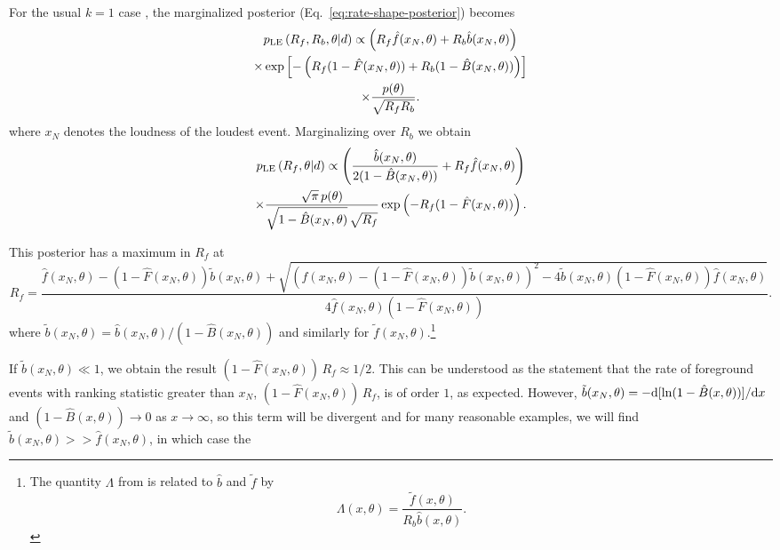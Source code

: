 \documentclass[aps,prd,reprint,nofootinbib]{revtex4-1}
\begin{document}
For the usual $k=1$ case \citep{Biswas2009}, the marginalized
posterior (Eq.~\eqref{eq:rate-shape-posterior}) becomes
\begin{multline}
p_{\rm LE}\left( R_f, R_b, \theta | d \right) \propto \left(R_f
\hat{f}(x_N,\theta) + R_b \hat{b}(x_N,\theta)\right) \\ \times \exp\left[-\left(
  R_f (1-\hat{F}(x_N,\theta)) + R_b (1-\hat{B}(x_N,\theta)) \right)
  \right] \\ \times \frac{p(\theta)}{\sqrt{R_f R_b}}.
\end{multline}
where $x_N$ denotes the loudness of the loudest event. Marginalizing
over $R_b$ we obtain
\begin{multline}
p_{\rm LE}\left( R_f, \theta | d \right) \propto \left(
\frac{\hat{b}(x_N,\theta)}{2(1-\hat{B}(x_N,\theta))} + R_f
\hat{f}(x_N,\theta)\right) \\ \times \frac{\sqrt{\pi}\,
  p(\theta)}{\sqrt{1-\hat{B}(x_N,\theta)}\,\sqrt{R_f}}
\exp\left(-R_f(1-\hat{F}(x_N,\theta))\right) .
\end{multline}
\begin{widetext}
This posterior has a maximum in $R_f$ at
\begin{equation}
R_f =
\frac{\hat{f}(x_N,\theta)-(1-\hat{F}(x_N,\theta))\tilde{b}(x_N,\theta)
  +
  \sqrt{\left(\hat{f}(x_N,\theta)-(1-\hat{F}(x_N,\theta))\tilde{b}(x_N,\theta)\right)^2
    -
    4\tilde{b}(x_N,\theta)(1-\hat{F}(x_N,\theta))\hat{f}(x_N,\theta)}}{4
  \hat{f}(x_N,\theta)(1-\hat{F}(x_N,\theta))}.
\end{equation}
where $\tilde{b}(x_N,\theta) = \hat{b}(x_N,\theta) /
(1-\hat{B}(x_N,\theta))$ and similarly for $\tilde{f}(x_N,\theta)$.\footnote{The quantity $\Lambda$ from
  \citet{Biswas2009} is related to $\hat{b}$ and $\tilde{f}$ by
  \begin{equation}
    \Lambda(x, \theta) = \frac{\tilde{f}(x,\theta)}{R_b \hat{b}(x,\theta)}.
\end{equation}}  
\end{widetext}
If $\tilde{b}(x_N,\theta) \ll 1$, we obtain the result $(1-
\hat{F}(x_N,\theta))\,R_f \approx 1/2$. This can be understood as the
statement that the rate of foreground events with ranking statistic
greater than $x_N$, $(1- \hat{F}(x_N,\theta))\,R_f$, is of order $1$,
as expected. However, $\tilde{b}(x_N,\theta) = -{\rm d}
[\ln(1-\hat{B}(x,\theta))]/{\rm d}x$ and $(1-\hat{B}(x,\theta))
\rightarrow 0$ as $x \rightarrow \infty$, so this term will be
divergent and for many reasonable examples, we will find
$\tilde{b}(x_N,\theta) >> \hat{f}(x_N,\theta)$, in which case the
\end{document}
